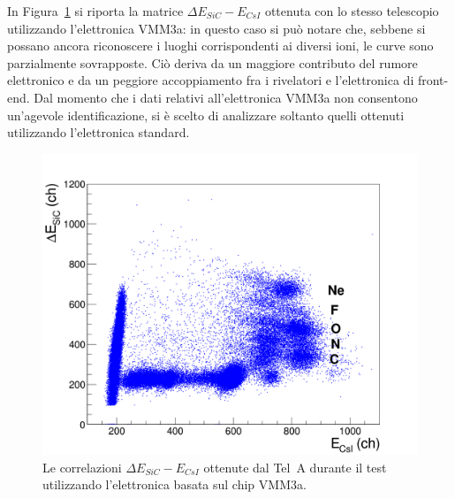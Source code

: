 


In Figura~\ref{fig:sic_csi_vmm3a} si riporta la  matrice $\Delta E_{SiC} - E_{CsI}$ ottenuta con lo stesso telescopio utilizzando l'elettronica VMM3a: in questo caso si può notare che, sebbene si possano ancora riconoscere i luoghi corrispondenti ai diversi ioni, le curve sono parzialmente sovrapposte.
Ciò deriva da un maggiore contributo del rumore elettronico e da un peggiore accoppiamento fra i rivelatori e l'elettronica di front-end.
Dal momento che i dati relativi all'elettronica VMM3a non consentono un'agevole identificazione, si è scelto di analizzare soltanto quelli ottenuti utilizzando l'elettronica standard.

\begin{figure} [!p]
	\centering
	\includegraphics[width=\textwidth, keepaspectratio]{Grafici_Tesi/Test/matrice_sic_csi_vmm3a.png}
	\caption{Le correlazioni $\Delta E_{SiC} - E_{CsI}$ ottenute dal Tel~A durante il test utilizzando l'elettronica basata sul chip VMM3a.} \label{fig:sic_csi_vmm3a}
\end{figure}

